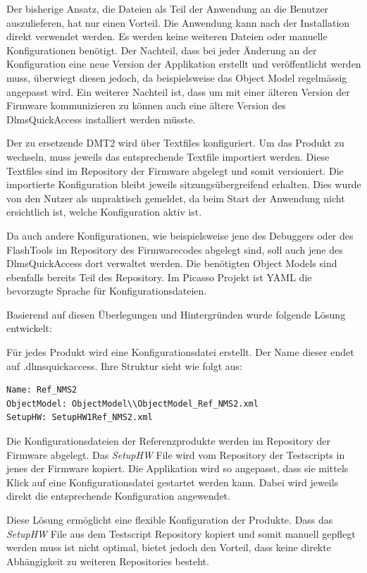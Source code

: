 Der bisherige Ansatz, die Dateien als Teil der Anwendung an die Benutzer auszulieferen, hat nur einen Vorteil.
Die Anwendung kann nach der Installation direkt verwendet werden.
Es werden keine weiteren Dateien oder manuelle Konfigurationen benötigt.
Der Nachteil, dass bei jeder Änderung an der Konfiguration eine neue Version der Applikation erstellt und veröffentlicht werden muss, überwiegt diesen jedoch, da beispielsweise das Object Model regelmässig angepasst wird.
Ein weiterer Nachteil ist, dass um mit einer älteren Version der Firmware kommunizieren zu können auch eine ältere Version des DlmsQuickAccess installiert werden müsste.

Der zu ersetzende \ac{DMT2} wird über Textfiles konfiguriert.
Um das Produkt zu wechseln, muss jeweils das entsprechende Textfile importiert werden.
Diese Textfiles sind im Repository der Firmware abgelegt und somit versioniert.
Die importierte Konfiguration bleibt jeweils sitzungsübergreifend erhalten.
Dies wurde von den Nutzer als unpraktisch gemeldet, da beim Start der Anwendung nicht ersichtlich ist, welche Konfiguration aktiv ist.

Da auch andere Konfigurationen, wie beispielsweise jene des Debuggers oder des FlashTools im Repository des Firmwarecodes abgelegt sind, soll auch jene des DlmsQuickAccess dort verwaltet werden.
Die benötigten Object Models sind ebenfalls bereits Teil des Repository.
Im Picasso Projekt ist \ac{YAML} die bevorzugte Sprache für Konfigurationsdateien.

Basierend auf diesen Überlegungen und Hintergründen wurde folgende Lösung entwickelt:

Für jedes Produkt wird eine Konfigurationsdatei erstellt.
Der Name dieser endet auf .dlmsquickaccess.
Ihre Struktur sieht wie folgt aus:
\begin{verbatim}
Name: Ref_NMS2
ObjectModel: ObjectModel\\ObjectModel_Ref_NMS2.xml
SetupHW: SetupHW1Ref_NMS2.xml
\end{verbatim}
Die Konfigurationsdateien der Referenzprodukte werden im Repository der Firmware abgelegt.
Das \textit{SetupHW} File wird vom Repository der Testscripts in jenes der Firmware kopiert.
Die Applikation wird so angepasst, dass sie mittels Klick auf eine Konfigurationsdatei gestartet werden kann.
Dabei wird jeweils direkt die entsprechende Konfiguration angewendet.

Diese Lösung ermöglicht eine flexible Konfiguration der Produkte.
Dass das \textit{SetupHW} File aus dem Testscript Repository kopiert und somit manuell gepflegt werden muss ist nicht optimal, bietet jedoch den Vorteil, dass keine direkte Abhängigkeit zu weiteren Repositories besteht.

